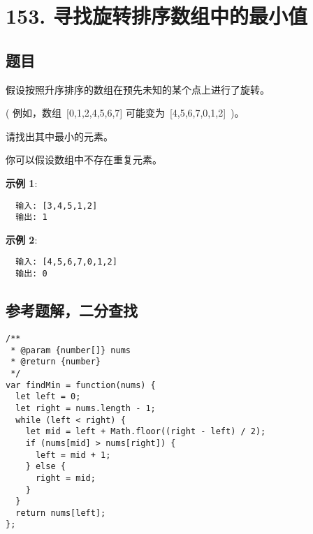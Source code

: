 \newpage
\section{153. 寻找旋转排序数组中的最小值}
\label{leetcode:153}

\subsection{题目}

假设按照升序排序的数组在预先未知的某个点上进行了旋转。

( 例如，数组 [0,1,2,4,5,6,7] 可能变为 [4,5,6,7,0,1,2] )。

请找出其中最小的元素。

你可以假设数组中不存在重复元素。

\textbf{示例 1}:

\begin{verbatim}
  输入: [3,4,5,1,2]
  输出: 1
\end{verbatim}

\textbf{示例 2}:

\begin{verbatim}
  输入: [4,5,6,7,0,1,2]
  输出: 0
\end{verbatim}

\subsection{参考题解，二分查找}

\begin{verbatim}
/**
 * @param {number[]} nums
 * @return {number}
 */
var findMin = function(nums) {
  let left = 0;
  let right = nums.length - 1;
  while (left < right) {
    let mid = left + Math.floor((right - left) / 2);
    if (nums[mid] > nums[right]) {
      left = mid + 1;
    } else {
      right = mid;
    }
  }
  return nums[left];
};
\end{verbatim}
